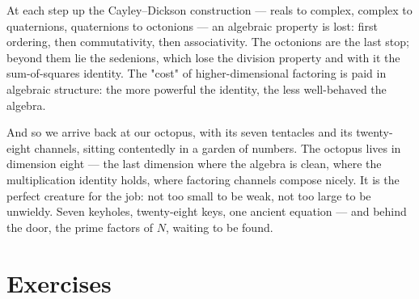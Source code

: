 \documentclass[11pt,twoside,openright]{book}
\theoremstyle{definition}
\theoremstyle{remark}
\begin{document}
At each step up the Cayley--Dickson construction --- reals to complex, complex to quaternions, quaternions to octonions --- an algebraic property is lost: first ordering, then commutativity, then associativity. The octonions are the last stop; beyond them lie the sedenions, which lose the division property and with it the sum-of-squares identity. The "cost" of higher-dimensional factoring is paid in algebraic structure: the more powerful the identity, the less well-behaved the algebra.

And so we arrive back at our octopus, with its seven tentacles and its twenty-eight channels, sitting contentedly in a garden of numbers. The octopus lives in dimension eight --- the last dimension where the algebra is clean, where the multiplication identity holds, where factoring channels compose nicely. It is the perfect creature for the job: not too small to be weak, not too large to be unwieldy. Seven keyholes, twenty-eight keys, one ancient equation --- and behind the door, the prime factors of $N$, waiting to be found.



\section{Exercises}
\end{document}

